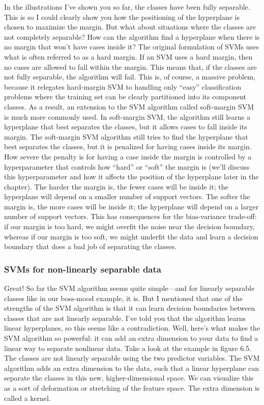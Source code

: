 \documentclass[
]{article}
\begin{document}
In the illustrations I've shown you so far, the classes have been fully
separable. This is so I could clearly show you how the positioning of
the hyperplane is chosen to maximize the margin. But what about
situations where the classes are not completely separable? How can the
algorithm find a hyperplane when there is no margin that won't have
cases inside it? The original formulation of SVMs uses what is often
referred to as a hard margin. If an SVM uses a hard margin, then no
cases are allowed to fall within the margin. This means that, if the
classes are not fully separable, the algorithm will fail. This is, of
course, a massive problem, because it relegates hard-margin SVM to
handling only ``easy'' classification problems where the training set
can be clearly partitioned into its component classes. As a result, an
extension to the SVM algorithm called soft-margin SVM is much more
commonly used. In soft-margin SVM, the algorithm still learns a
hyperplane that best separates the classes, but it allows cases to fall
inside its margin. The soft-margin SVM algorithm still tries to find the
hyperplane that best separates the classes, but it is penalized for
having cases inside its margin. How severe the penalty is for having a
case inside the margin is controlled by a hyperparameter that controls
how ``hard'' or ``soft'' the margin is (we'll discuss this
hyperparameter and how it affects the position of the hyperplane later
in the chapter). The harder the margin is, the fewer cases will be
inside it; the hyperplane will depend on a smaller number of support
vectors. The softer the margin is, the more cases will be inside it; the
hyperplane will depend on a larger number of support vectors. This has
consequences for the bias-variance trade-off: if our margin is too hard,
we might overfit the noise near the decision boundary, whereas if our
margin is too soft, we might underfit the data and learn a decision
boundary that does a bad job of separating the classes.

\subsubsection{SVMs for non-linearly separable
data}\label{svms-for-non-linearly-separable-data}

Great! So far the SVM algorithm seems quite simple---and for linearly
separable classes like in our boss-mood example, it is. But I mentioned
that one of the strengths of the SVM algorithm is that it can learn
decision boundaries between classes that are not linearly separable.
I've told you that the algorithm learns linear hyperplanes, so this
seems like a contradiction. Well, here's what makes the SVM algorithm so
powerful: it can add an extra dimension to your data to find a linear
way to separate nonlinear data. Take a look at the example in figure
6.5. The classes are not linearly separable using the two predictor
variables. The SVM algorithm adds an extra dimension to the data, such
that a linear hyperplane can separate the classes in this new,
higher-dimensional space. We can visualize this as a sort of deformation
or stretching of the feature space. The extra dimension is called a
kernel.
\end{document}
